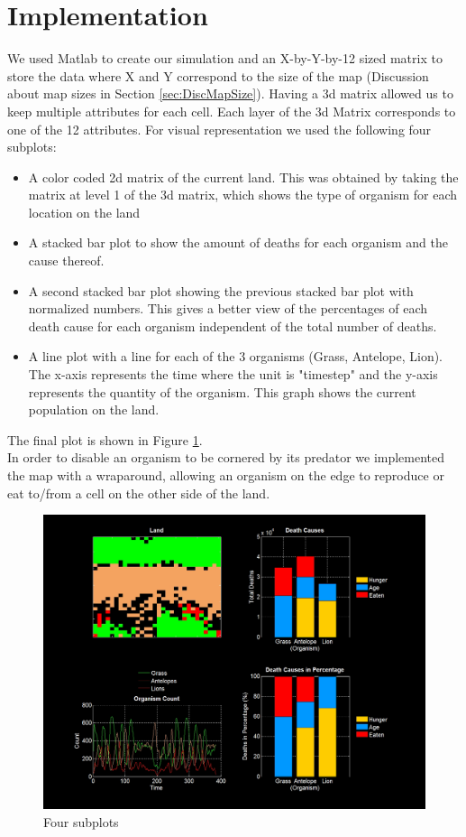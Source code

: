 \documentclass[11pt]{article}
\begin{document}
\section{Implementation}
We used Matlab to create our simulation and an X-by-Y-by-12 sized matrix to store the data where X and Y correspond to the size of the map (Discussion about map sizes in Section \ref{sec:DiscMapSize}). Having a 3d matrix allowed us to keep multiple attributes for each cell. Each layer of the 3d Matrix corresponds to one of the 12 attributes. For visual representation we used the following four subplots:
\begin{itemize}
\item A color coded 2d matrix of the current land. This was obtained by taking the matrix at level 1 of the 3d matrix, which shows the type of organism for each location on the land
\item A stacked bar plot to show the amount of deaths for each organism and the cause thereof.
\item  A second stacked bar plot showing the previous stacked bar plot with normalized numbers. This gives a better view of the percentages of each death cause for each organism independent of the total number of deaths. 
\item A line plot with a line for each of the 3 organisms (Grass, Antelope, Lion). The x-axis represents the time where the unit is "timestep" and the y-axis represents the quantity of the organism. This graph shows the current population on the land.
\end{itemize}
The final plot is shown in Figure \ref{fig:plotScreenshot}.\\
In order to disable an organism to be cornered by its predator we implemented the map with a wraparound, allowing an organism on the edge to reproduce or eat to/from a cell on the other side of the land. 
\begin{figure}
\includegraphics[scale=0.35]{plotScreenshot.png}
\caption{Four subplots}
\label{fig:plotScreenshot}
\end{figure}
\end{document}
